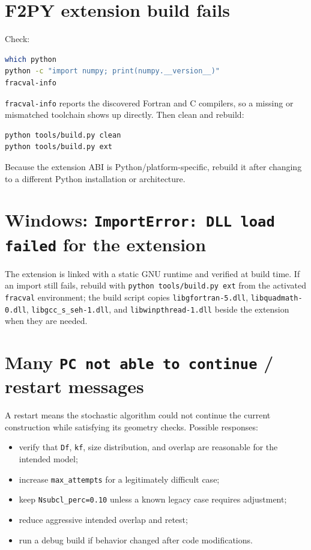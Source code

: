 \documentclass[11pt,oneside]{report}
\newcommand{\code}[1]{\texttt{#1}}
\begin{document}
\section{F2PY extension build fails}

Check:

\begin{lstlisting}[language=bash]
which python
python -c "import numpy; print(numpy.__version__)"
fracval-info
\end{lstlisting}

\code{fracval-info} reports the discovered Fortran and C compilers, so a
missing or mismatched toolchain shows up directly. Then clean and rebuild:

\begin{lstlisting}[language=bash]
python tools/build.py clean
python tools/build.py ext
\end{lstlisting}

Because the extension ABI is Python/platform-specific, rebuild it after changing
to a different Python installation or architecture.

\section{Windows: \code{ImportError: DLL load failed} for the extension}

The extension is linked with a static GNU runtime and verified at build time.
If an import still fails, rebuild with \code{python tools/build.py ext} from
the activated \code{fracval} environment; the build script copies
\code{libgfortran-5.dll}, \code{libquadmath-0.dll}, \code{libgcc\_s\_seh-1.dll},
and \code{libwinpthread-1.dll} beside the extension when they are needed.

\section{Many \code{PC not able to continue} / restart messages}

A restart means the stochastic algorithm could not continue the current
construction while satisfying its geometry checks. Possible responses:
\begin{itemize}
  \item verify that \code{Df}, \code{kf}, size distribution, and overlap are reasonable for the intended model;
  \item increase \code{max\_attempts} for a legitimately difficult case;
  \item keep \code{Nsubcl\_perc=0.10} unless a known legacy case requires adjustment;
  \item reduce aggressive intended overlap and retest;
  \item run a debug build if behavior changed after code modifications.
\end{itemize}
\end{document}
